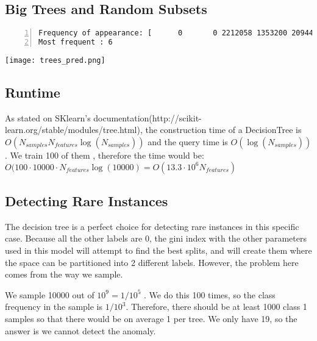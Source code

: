 \subsection{Big Trees and Random Subsets}
\begin{lstlisting}[language={},numbers=left,numberstyle=\tiny,frame=single,breaklines=true,postbreak=\mbox{\textcolor{red}{$\hookrightarrow$}\space}]
Frequency of appearance: [      0       0 2212058 1353200 2094475   22530 2690463  536110   91164]
Most frequent : 6
\end{lstlisting}

\texttt{[image: trees\_pred.png]}


\subsection{Runtime}
As stated on SKlearn's documentation(http://scikit-learn.org/stable/modules/tree.html), the construction time of a DecisionTree is $O(N_{samples} N_{features}\log(N_{samples}))$ and the query time is $O(\log(N_{samples}))$. We train 100 of them , therefore the time would be: $O(100 \cdot 10000 \cdot N_{features}\log(10000) =O(13.3\cdot10^6 N_{features})$


\subsection{Detecting Rare Instances}
The decision tree is a perfect choice for detecting rare instances in this specific case. Because all the other labels are 0, the gini index with the other parameters used in this model will attempt to find the best splits, and will create them where the space can be partitioned into 2 different labels. However, the problem here comes from the way we sample. 

We sample 10000 out of $10^9 = 1/10^5$ . We do this 100 times, so the class frequency in the sample is $1/10^3$. Therefore, there should be at least 1000 class 1 samples so that there would be on average 1 per tree. We only have 19, so the answer is we cannot detect the anomaly.